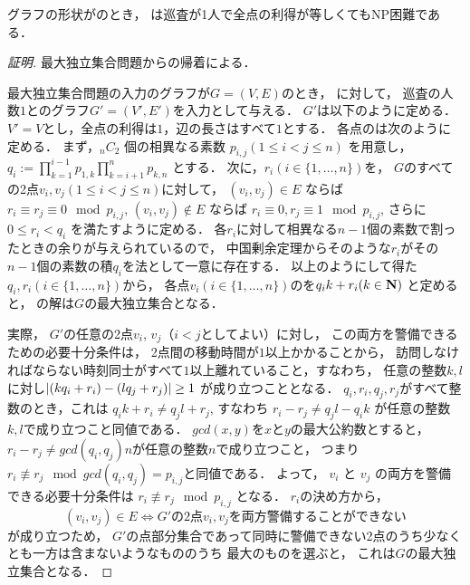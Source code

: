 
\begin{theo}
  \label{theo:unit_exacidletime_NPhard}
  グラフの形状が{\graphUnit}のとき，
  {\timeSpecifiedPatProb}は巡査が1人で全点の利得が等しくてもNP困難である．
\end{theo}


\begin{proof}[証明]
  最大独立集合問題からの帰着による．

  最大独立集合問題の入力のグラフが$G = (V, E)$のとき，
  {\timeSpecifiedPatProb}に対して，
  巡査の人数$1$と{\graphUnit}のグラフ$G' = (V', E')$を入力として与える．
  $G'$は以下のように定める．
  $V' = V$とし，全点の利得は$1$，辺の長さはすべて$1$とする．
  各点の{\exactidletime}は次のように定める．
  まず，${}_n C_2$ 個の相異なる素数 $p_{i,j} (1 \leq i < j \leq n)$ を用意し，
  $q_i := \prod_{k = 1}^{i - 1} p_{1,k} \prod_{k = i + 1}^n p_{k,n}$
  とする．
  次に，$r_i (i \in \{1, \ldots, n\})$を，
  $G$のすべての2点$v_i, v_j (1 \leq i < j \leq n)$に対して，
  $(v_i, v_j) \in E$     ならば $r_i \equiv    r_j \equiv 0 \mod p_{i,j}$,
  $(v_i, v_j) \not\in E$ ならば $r_i \equiv 0, r_j \equiv 1 \mod p_{i,j}$,
  さらに$0 \leq r_i < q_i$
  を満たすように定める．
  各$r_i$に対して相異なる$n - 1$個の素数で割ったときの余りが与えられているので，
  中国剰余定理からそのような$r_i$がその$n - 1$個の素数の積$q_i$を法として一意に存在する．
  以上のようにして得た$q_i, r_i (i \in \{ 1, \ldots, n\})$から，
  各点$v_i (i \in \{1, \ldots, n\})$の{\exactidletime}を$q_i k + r_i (k \in \mathbf N)$
  と定めると，
  {\timeSpecifiedPatProb}の解は$G$の最大独立集合となる．

  実際，
  $G'$の任意の2点$v_i$, $v_j$（$i < j$としてよい）に対し，
  この両方を警備できるための必要十分条件は，
  2点間の移動時間が$1$以上かかることから，
  訪問しなければならない時刻同士がすべて$1$以上離れていること，すなわち，
  任意の整数$k, l$に対し$\lvert{(k q_i + r_i) - (l q_j + r_j)}\rvert \geq 1$
  が成り立つこととなる．
  $q_i, r_i, q_j, r_j$がすべて整数のとき，これは
  $q_i k + r_i \neq q_j l + r_j$, 
  すなわち
  $r_i - r_j \neq q_j l - q_i k$
  が任意の整数$k, l$で成り立つこと同値である．
  $gcd(x,y)$を$x$と$y$の最大公約数とすると，
  $r_i - r_j \neq gcd(q_i,q_j) n$が任意の整数$n$で成り立つこと，
  つまり$r_i \not\equiv r_j \mod gcd(q_i, q_j) = p_{i,j}$と同値である．
  よって，
  $v_i$ と $v_j$ の両方を警備できる必要十分条件は
  $r_i \not\equiv r_j \mod p_{i, j}$
  となる．
  $r_i$の決め方から，
  \[
    (v_i, v_j) \in E \iff \text{$G'$の2点$v_i, v_j$を両方警備することができない}
  \]
  が成り立つため，
  $G'$の点部分集合であって同時に警備できない2点のうち少なくとも一方は含まないようなもののうち
  最大のものを選ぶと，
  これは$G$の最大独立集合となる．


\end{proof}
